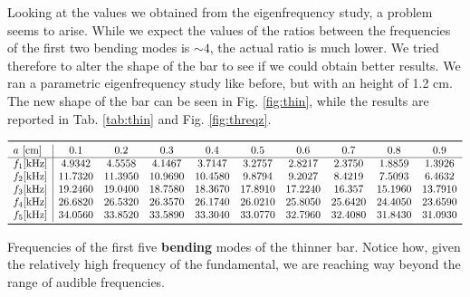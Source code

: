 \documentclass[a4paper]{article}
\begin{document}
Looking at the values we obtained from the eigenfrequency study, a problem seems to arise. While we expect the values of the ratios between the frequencies of the first two bending modes is $\sim 4$, the actual ratio is much lower. We tried therefore to alter the shape of the bar to see if we could obtain better results. We ran a parametric eigenfrequency study like before, but with an height of 1.2 cm. The new shape of the bar can be seen in Fig. \ref{fig:thin}, while the results are reported in Tab. \ref{tab:thin} and Fig. \ref{fig:threqz}.

\begin{table}[h]
	\centering
	$\begin{array}{l|ccccccccc}
		\toprule
		a~[\si{\centi\meter}] & 0.1 & 0.2 & 0.3 & 0.4 & 0.5 & 0.6 & 0.7 & 0.8 & 0.9\\
		\hline
		f_1[\si{\kilo\hertz}]&4.9342   & 4.5558  &  4.1467  &  3.7147   & 3.2757  &  2.8217 &   2.3750 &   1.8859 &   1.3926\\
		f_2[\si{\kilo\hertz}]&11.7320  & 11.3950  & 10.9690 &  10.4580 &   9.8794  &  9.2027  &  8.4219  &  7.5093  &  6.4632\\
		f_3[\si{\kilo\hertz}]&19.2460  & 19.0400  & 18.7580 &  18.3670 &  17.8910  & 17.2240 &   16.357 &  15.1960 &  13.7910\\
		f_4[\si{\kilo\hertz}]&26.6820  & 26.5320  & 26.3570 &  26.1740  & 26.0210 &  25.8050 &  25.6420  & 24.4050 &  23.6590\\
		f_5[\si{\kilo\hertz}]&34.0560 &  33.8520  & 33.5890  & 33.3040  & 33.0770  & 32.7960  & 32.4080 &  31.8430  & 31.0930\\
		\bottomrule
	\end{array}$
	\caption{Frequencies of the first five \textbf{bending} modes of the thinner bar. Notice how, given the relatively high frequency of the fundamental, we are reaching way beyond the range of audible frequencies.}
	\label{tab:thin}
\end{table}
\end{document}
